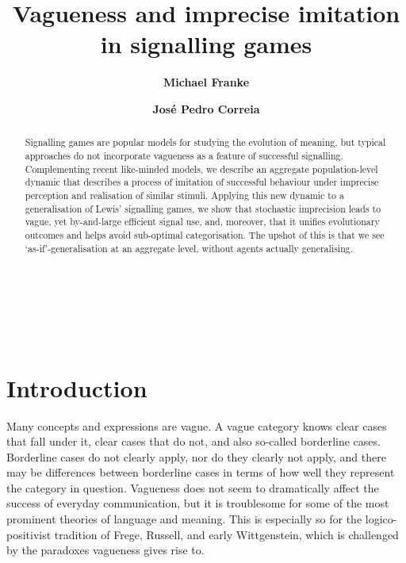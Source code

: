 \documentclass[12pt,english]{article}
\numberwithin{equation}{section}
\begin{document}
\title{{\normalsize \textbf{Vagueness and imprecise imitation in signalling games}}}
\author{{\normalsize \textbf{Michael Franke}} \and {\normalsize \textbf{Jos\'e Pedro Correia}}}
\date{}

\maketitle

\thispagestyle{empty}

\begin{abstract}
  Signalling games are popular models for studying the evolution of meaning, but typical
  approaches do not incorporate vagueness as a feature of successful signalling.  Complementing
  recent like-minded models, we describe an aggregate population-level dynamic that describes a
  process of imitation of successful behaviour under imprecise perception and realisation of
  similar stimuli. Applying this new dynamic to a generalisation of Lewis' signalling games, we
  show that stochastic imprecision leads to vague, yet by-and-large efficient signal use, and,
  moreover, that it unifies evolutionary outcomes and helps avoid sub-optimal
  categorisation. The upshot of this is that we see `as-if'-generalisation at an aggregate
  level, without agents actually generalising.
\end{abstract}

\mbox{} \\

\tableofcontents

\mbox{} \\

\section{Introduction}
\label{sec:introduction}

Many concepts and expressions are vague. A vague category knows clear cases that fall under it,
clear cases that do not, and also so-called borderline cases. Borderline cases do not clearly
apply, nor do they clearly not apply, and there may be differences between borderline cases in
terms of how well they represent the category in question. Vagueness does not seem to
dramatically affect the success of everyday communication, but it is troublesome for some of
the most prominent theories of language and meaning. This is especially so for the
logico-positivist tradition of Frege, Russell, and early Wittgenstein, which is challenged by
the paradoxes vagueness gives rise to.
\end{document}

